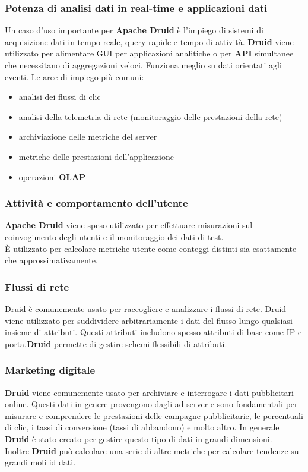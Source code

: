 \documentclass{article}
\begin{document}
\subsubsection{Potenza di analisi dati in real-time e applicazioni dati}
Un caso d'uso importante per \textbf{Apache Druid} è l'impiego di sistemi di acquisizione dati in tempo reale, query rapide e tempo di attività. \textbf{Druid} viene utilizzato per alimentare GUI per applicazioni analitiche o per \textbf{API} simultanee che necessitano di aggregazioni veloci. Funziona meglio su dati orientati agli eventi.
Le aree di impiego più comuni:
\begin{itemize}
    \item analisi dei flussi di clic
    \item analisi della telemetria di rete (monitoraggio delle prestazioni della rete)
    \item archiviazione delle metriche del server
    \item metriche delle prestazioni dell'applicazione
    \item operazioni \textbf{OLAP}
\end{itemize}
\subsubsection{Attività e comportamento dell'utente}
\textbf{Apache Druid} viene speso utilizzato per effettuare misurazioni sul coinvogimento degli utenti e il monitoraggio dei dati di test. \\
È utilizzato per calcolare metriche utente come conteggi distinti sia esattamente che approssimativamente.
\subsubsection{Flussi di rete}
Druid è comunemente usato per raccogliere e analizzare i flussi di rete. Druid viene utilizzato per  suddividere arbitrariamente i dati del flusso lungo qualsiasi insieme di attributi.
Questi attributi includono spesso attributi di base come IP e porta.\textbf{Druid} permette di gestire schemi flessibili di attributi.
\subsubsection{Marketing digitale}
\textbf{Druid} viene comunemente usato per archiviare e interrogare i dati pubblicitari online. Questi dati in genere provengono dagli ad server e sono fondamentali per misurare e comprendere le prestazioni delle campagne pubblicitarie, le percentuali di clic, i tassi di conversione (tassi di abbandono) e molto altro. In generale \textbf{Druid} è stato creato per gestire questo tipo di dati in grandi dimensioni.\\
Inoltre \textbf{Druid} può calcolare una serie di altre metriche per calcolare tendenze su grandi moli id dati.
\end{document}
